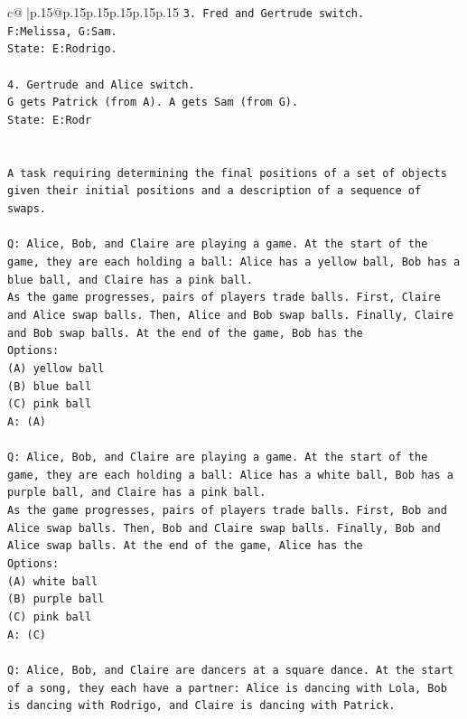 \documentclass{article}
\begin{document}
{\begin{supertabular}{c@{$\;$}|p{.15\linewidth}@{}p{.15\linewidth}p{.15\linewidth}p{.15\linewidth}p{.15\linewidth}p{.15\linewidth}}
{{{\texttt{3. Fred and Gertrude switch.} \\
\texttt{F:Melissa, G:Sam.} \\
\texttt{State: E:Rodrigo.} \\
\\ 
\texttt{4. Gertrude and Alice switch.} \\
\texttt{G gets Patrick (from A). A gets Sam (from G).} \\
\texttt{State: E:Rodr} \\
\\ 
\\ 
\texttt{A task requiring determining the final positions of a set of objects given their initial positions and a description of a sequence of swaps.} \\
\\ 
\texttt{Q: Alice, Bob, and Claire are playing a game. At the start of the game, they are each holding a ball: Alice has a yellow ball, Bob has a blue ball, and Claire has a pink ball.} \\
\texttt{As the game progresses, pairs of players trade balls. First, Claire and Alice swap balls. Then, Alice and Bob swap balls. Finally, Claire and Bob swap balls. At the end of the game, Bob has the} \\
\texttt{Options:} \\
\texttt{(A) yellow ball} \\
\texttt{(B) blue ball} \\
\texttt{(C) pink ball} \\
\texttt{A: (A)} \\
\\ 
\texttt{Q: Alice, Bob, and Claire are playing a game. At the start of the game, they are each holding a ball: Alice has a white ball, Bob has a purple ball, and Claire has a pink ball.} \\
\texttt{As the game progresses, pairs of players trade balls. First, Bob and Alice swap balls. Then, Bob and Claire swap balls. Finally, Bob and Alice swap balls. At the end of the game, Alice has the} \\
\texttt{Options:} \\
\texttt{(A) white ball} \\
\texttt{(B) purple ball} \\
\texttt{(C) pink ball} \\
\texttt{A: (C)} \\
\\ 
\texttt{Q: Alice, Bob, and Claire are dancers at a square dance. At the start of a song, they each have a partner: Alice is dancing with Lola, Bob is dancing with Rodrigo, and Claire is dancing with Patrick.} \\
}}}
\end{supertabular}}
\end{document}
